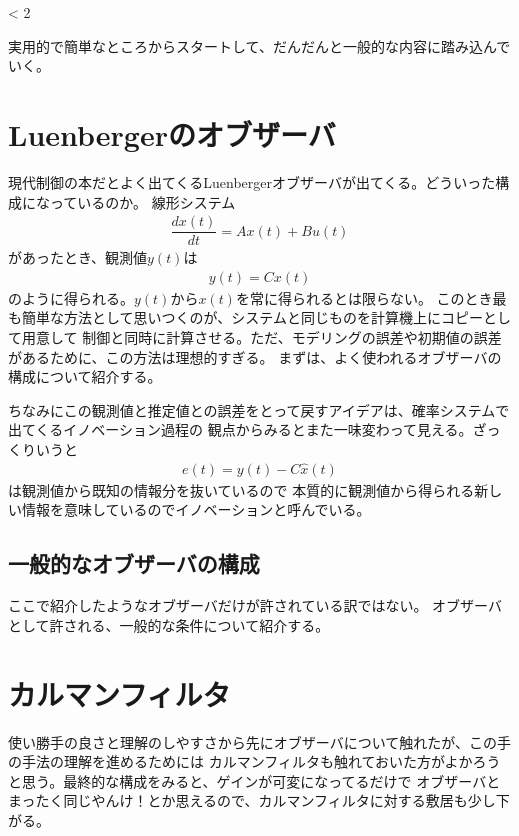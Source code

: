 \ifnum {} < 2%




\fi
実用的で簡単なところからスタートして、だんだんと一般的な内容に踏み込んでいく。

\section{Luenbergerのオブザーバ}

現代制御の本だとよく出てくるLuenbergerオブザーバが出てくる。どういった構成になっているのか。
線形システム
\begin{align}
\dfrac{dx(t)}{dt}=Ax(t)+Bu(t)
\end{align}
があったとき、観測値$y(t)$は
\begin{align}
y(t)=Cx(t)
\end{align}
のように得られる。$y(t)$から$x(t)$を常に得られるとは限らない。
このとき最も簡単な方法として思いつくのが、システムと同じものを計算機上にコピーとして用意して
制御と同時に計算させる。ただ、モデリングの誤差や初期値の誤差があるために、この方法は理想的すぎる。
まずは、よく使われるオブザーバの構成について紹介する。


ちなみにこの観測値と推定値との誤差をとって戻すアイデアは、確率システムで出てくるイノベーション過程の
観点からみるとまた一味変わって見える。ざっくりいうと
\begin{align}
e(t)=y(t)-C\hat{x}(t)
\end{align}
は観測値から既知の情報分を抜いているので
本質的に観測値から得られる新しい情報を意味しているのでイノベーションと呼んでいる。

\subsection{一般的なオブザーバの構成}
ここで紹介したようなオブザーバだけが許されている訳ではない。
オブザーバとして許される、一般的な条件について紹介する。



\section{カルマンフィルタ}

使い勝手の良さと理解のしやすさから先にオブザーバについて触れたが、この手の手法の理解を進めるためには
カルマンフィルタも触れておいた方がよかろうと思う。最終的な構成をみると、ゲインが可変になってるだけで
オブザーバとまったく同じやんけ！とか思えるので、カルマンフィルタに対する敷居も少し下がる。

